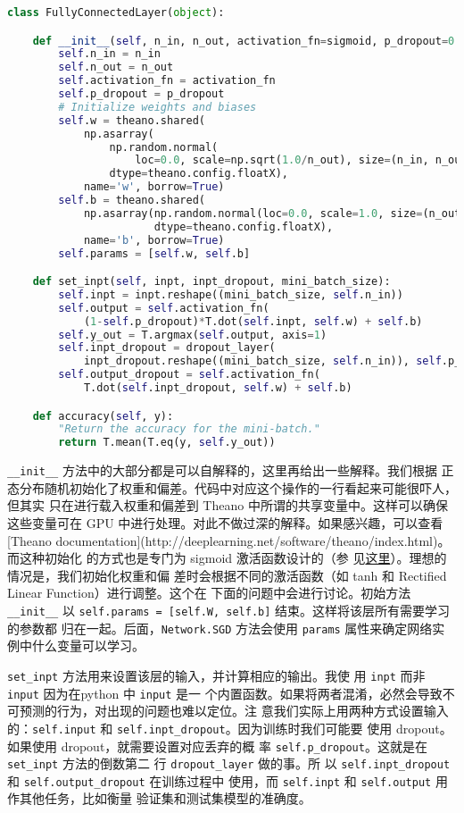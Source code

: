 \begin{lstlisting}[language=Python]
class FullyConnectedLayer(object):

    def __init__(self, n_in, n_out, activation_fn=sigmoid, p_dropout=0.0):
        self.n_in = n_in
        self.n_out = n_out
        self.activation_fn = activation_fn
        self.p_dropout = p_dropout
        # Initialize weights and biases
        self.w = theano.shared(
            np.asarray(
                np.random.normal(
                    loc=0.0, scale=np.sqrt(1.0/n_out), size=(n_in, n_out)),
                dtype=theano.config.floatX),
            name='w', borrow=True)
        self.b = theano.shared(
            np.asarray(np.random.normal(loc=0.0, scale=1.0, size=(n_out,)),
                       dtype=theano.config.floatX),
            name='b', borrow=True)
        self.params = [self.w, self.b]

    def set_inpt(self, inpt, inpt_dropout, mini_batch_size):
        self.inpt = inpt.reshape((mini_batch_size, self.n_in))
        self.output = self.activation_fn(
            (1-self.p_dropout)*T.dot(self.inpt, self.w) + self.b)
        self.y_out = T.argmax(self.output, axis=1)
        self.inpt_dropout = dropout_layer(
            inpt_dropout.reshape((mini_batch_size, self.n_in)), self.p_dropout)
        self.output_dropout = self.activation_fn(
            T.dot(self.inpt_dropout, self.w) + self.b)

    def accuracy(self, y):
        "Return the accuracy for the mini-batch."
        return T.mean(T.eq(y, self.y_out))
\end{lstlisting}

\lstinline!__init__! 方法中的大部分都是可以自解释的，这里再给出一些解释。我们根据
正态分布随机初始化了权重和偏差。代码中对应这个操作的一行看起来可能很吓人，但其实
只在进行载入权重和偏差到 Theano 中所谓的共享变量中。这样可以确保这些变量可在 GPU
中进行处理。对此不做过深的解释。如果感兴趣，可以查看[Theano
documentation](http://deeplearning.net/software/theano/index.html)。而这种初始化
的方式也是专门为 sigmoid 激活函数设计的（参
见\hyperref[sec:weight_initialization]{这里}）。理想的情况是，我们初始化权重和偏
差时会根据不同的激活函数（如 tanh 和 Rectified Linear Function）进行调整。这个在
下面的问题中会进行讨论。初始方法 \lstinline!__init__! 以
\lstinline!self.params = [self.W, self.b]! 结束。这样将该层所有需要学习的参数都
归在一起。后面，\lstinline!Network.SGD! 方法会使用 \lstinline!params! 
属性来确定网络实例中什么变量可以学习。

\lstinline!set_inpt! 方法用来设置该层的输入，并计算相应的输出。我使
用 \lstinline!inpt! 而非 \lstinline!input! 因为在python 中 \lstinline!input! 是一
个内置函数。如果将两者混淆，必然会导致不可预测的行为，对出现的问题也难以定位。注
意我们实际上用两种方式设置输入
的：\lstinline!self.input! 和 \lstinline!self.inpt_dropout!。因为训练时我们可能要
使用 dropout。如果使用 dropout，就需要设置对应丢弃的概
率 \lstinline!self.p_dropout!。这就是在 \lstinline!set_inpt! 方法的倒数第二
行 \lstinline!dropout_layer! 做的事。所
以 \lstinline!self.inpt_dropout! 和 \lstinline!self.output_dropout! 在训练过程中
使用，而 \lstinline!self.inpt! 和 \lstinline!self.output! 用作其他任务，比如衡量
验证集和测试集模型的准确度。

